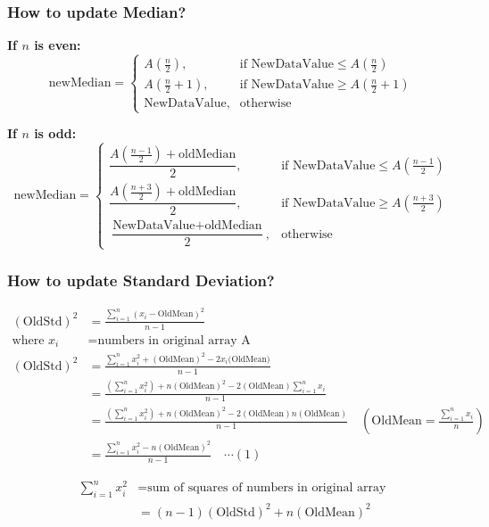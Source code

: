 \documentclass[12pt]{article}
\begin{document}
\subsubsection{How to update Median?}
\textbf{If $n$ is even:}
\[
\text{newMedian} =
\begin{cases}
A\left( \frac{n}{2} \right), & \text{if } \text{NewDataValue} \leq A\left( \frac{n}{2} \right) \\[8pt]
A\left( \frac{n}{2} + 1 \right), & \text{if } \text{NewDataValue} \geq A\left( \frac{n}{2} + 1 \right) \\[8pt]
\text{NewDataValue}, & \text{otherwise}
\end{cases}
\]

\textbf{If $n$ is odd:}
\[
\text{newMedian} =
\begin{cases}
\dfrac{A\left( \frac{n-1}{2} \right) + \text{oldMedian}}{2}, & \text{if } \text{NewDataValue} \leq A\left( \frac{n-1}{2} \right) \\[12pt]
\dfrac{A\left( \frac{n+3}{2} \right) + \text{oldMedian}}{2}, & \text{if } \text{NewDataValue} \geq A\left( \frac{n+3}{2} \right) \\[12pt]
\dfrac{\text{NewDataValue} + \text{oldMedian}}{2}, & \text{otherwise}
\end{cases}
\]
\subsubsection{How to update Standard Deviation?}
\begin{align*}
(\text{OldStd})^2 & = \frac{\sum_{i=1}^{n} (x_i - \text{OldMean})^2}{n-1} \\
\text{where } x_i & = \text{numbers in original array A} \\
(\text{OldStd})^2 & = \frac{\sum_{i=1}^{n} x_i^2 + (\text{OldMean})^2 - 2x_i \text{(OldMean)}}{n-1} \\
& = \frac{\left(\sum_{i=1}^{n} x_i^2\right) + n(\text{OldMean})^2 - 2(\text{OldMean})\sum_{i=1}^{n} x_i}{n-1} \\
& = \frac{\left(\sum_{i=1}^{n} x_i^2\right) + n(\text{OldMean})^2 - 2(\text{OldMean})n(\text{OldMean})}{n-1} \quad \left( \text{OldMean} = \frac{\sum_{i=1}^{n} x_i}{n} \right) \\
& = \frac{\sum_{i=1}^{n} x_i^2 - n(\text{OldMean})^2}{n-1} \quad \cdots (1)
\end{align*}

\begin{align*}
\sum_{i=1}^{n} x_i^2 & = \text{sum of squares of numbers in original array} \\
& = (n-1)(\text{OldStd})^2 + n(\text{OldMean})^2
\end{align*}
\end{document}
